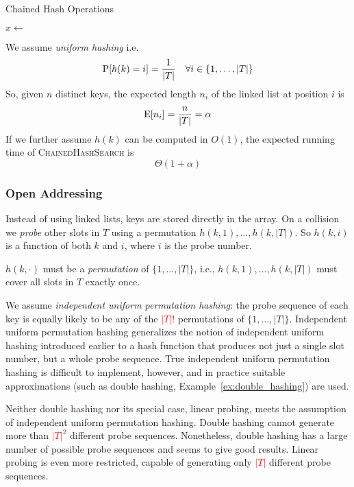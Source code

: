 


\begin{algorithm}[htb]
  \caption{Chained Hash Operations}
  \label{alg:chained_hash}
  \begin{algorithmic}[1]
      \State {}
    \EndFunction
      \State \Return {}
    \EndFunction
      \State $x \gets$ 
       \State {} \EndIf
    \EndFunction
  \end{algorithmic}
\end{algorithm}

We assume \emph{uniform hashing} i.e.
\[
\operatorname{P}[h(k) = i] = \frac{1}{|T|} \quad \forall i \in \{1,\dots,|T|\}
\]
So, given \(n\) distinct keys, the expected length \(n_i\) of the linked list at position \(i\) is
\[
\operatorname{E}[n_i] = \frac{n}{|T|} = \alpha
\]
If we further assume \(h(k)\) can be computed in \(O(1)\), the expected running time of \textsc{ChainedHashSearch} is
\[\boxed{
\Theta(1+\alpha)
}\]

\subsubsection{Open Addressing}

Instead of using linked lists, keys are stored directly in the array. 
On a collision we \emph{probe} other slots in \(T\) using a permutation \(h(k,1),\dots,h(k,|T|)\). 
So \(h(k,i)\) is a function of both \(k\) and \(i\), where \(i\) is the probe number.

\(h(k,\cdot)\) must be a \emph{permutation} of \(\{1,\dots,|T|\}\), i.e., \(h(k,1), \dots, h(k,|T|)\) must cover all slots in \(T\) exactly once.


We assume \emph{independent uniform permutation hashing}: the probe sequence of each key is equally likely to be any of the \textcolor{red}{\(|T|!\)} permutations of \(\{1,\dots,|T|\}\).
Independent uniform permutation hashing generalizes the notion of independent uniform hashing introduced earlier to a hash function that produces not just a single slot number, but a whole probe sequence. 
True independent uniform permutation hashing is difficult to implement, however, and in practice suitable approximations (such as double hashing,  Example~\ref{ex:double_hashing}) are used.

Neither double hashing nor its special case, linear probing, meets the assumption of independent uniform permutation hashing. 
Double hashing cannot generate more than \textcolor{red}{\(|T|^2\)} different probe sequences.
Nonetheless, double hashing has a large number of possible probe sequences and seems to give good results. 
Linear probing is even more restricted, capable of generating only \textcolor{red}{\(|T|\)} different probe sequences.

